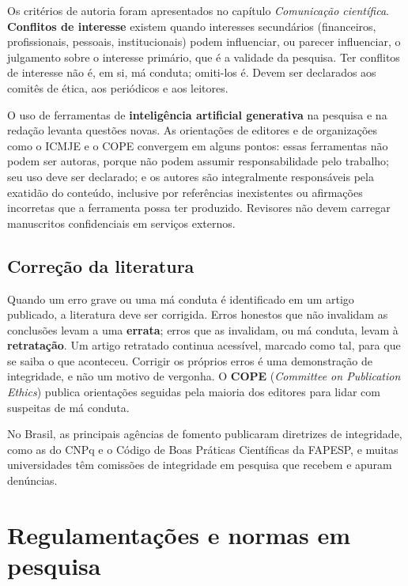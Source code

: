 \documentclass[
]{book}
\begin{document}
Os critérios de autoria foram apresentados no capítulo \emph{Comunicação científica}. \textbf{Conflitos de interesse} existem quando interesses secundários (financeiros, profissionais, pessoais, institucionais) podem influenciar, ou parecer influenciar, o julgamento sobre o interesse primário, que é a validade da pesquisa. Ter conflitos de interesse não é, em si, má conduta; omiti-los é. Devem ser declarados aos comitês de ética, aos periódicos e aos leitores.

O uso de ferramentas de \textbf{inteligência artificial generativa} na pesquisa e na redação levanta questões novas. As orientações de editores e de organizações como o ICMJE e o COPE convergem em alguns pontos: essas ferramentas não podem ser autoras, porque não podem assumir responsabilidade pelo trabalho; seu uso deve ser declarado; e os autores são integralmente responsáveis pela exatidão do conteúdo, inclusive por referências inexistentes ou afirmações incorretas que a ferramenta possa ter produzido. Revisores não devem carregar manuscritos confidenciais em serviços externos.

\subsection{Correção da literatura}\label{correuxe7uxe3o-da-literatura}

Quando um erro grave ou uma má conduta é identificado em um artigo publicado, a literatura deve ser corrigida. Erros honestos que não invalidam as conclusões levam a uma \textbf{errata}; erros que as invalidam, ou má conduta, levam à \textbf{retratação}. Um artigo retratado continua acessível, marcado como tal, para que se saiba o que aconteceu. Corrigir os próprios erros é uma demonstração de integridade, e não um motivo de vergonha. O \textbf{COPE} (\emph{Committee on Publication Ethics}) publica orientações seguidas pela maioria dos editores para lidar com suspeitas de má conduta.

No Brasil, as principais agências de fomento publicaram diretrizes de integridade, como as do CNPq e o Código de Boas Práticas Científicas da FAPESP, e muitas universidades têm comissões de integridade em pesquisa que recebem e apuram denúncias.

\section{Regulamentações e normas em pesquisa}\label{regulamentauxe7uxf5es-e-normas-em-pesquisa}
\end{document}
